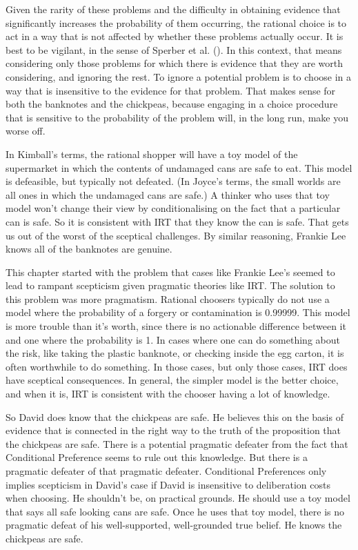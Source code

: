 \documentclass[
  10pt,
  letterpaper,
  twoside]{scrbook}
\begin{document}
Given the rarity of these problems and the difficulty in obtaining
evidence that significantly increases the probability of them occurring,
the rational choice is to act in a way that is not affected by whether
these problems actually occur. It is best to be vigilant, in the sense
of Sperber et al. (). In this
context, that means considering only those problems for which there is
evidence that they are worth considering, and ignoring the rest. To
ignore a potential problem is to choose in a way that is insensitive to
the evidence for that problem. That makes sense for both the banknotes
and the chickpeas, because engaging in a choice procedure that is
sensitive to the probability of the problem will, in the long run, make
you worse off.

In Kimball's terms, the rational shopper will have a toy model of the
supermarket in which the contents of undamaged cans are safe to eat.
This model is defeasible, but typically not defeated. (In Joyce's terms,
the small worlds are all ones in which the undamaged cans are safe.) A
thinker who uses that toy model won't change their view by
conditionalising on the fact that a particular can is safe. So it is
consistent with IRT that they know the can is safe. That gets us out of
the worst of the sceptical challenges. By similar reasoning, Frankie Lee
knows all of the banknotes are genuine.

This chapter started with the problem that cases like Frankie Lee's
seemed to lead to rampant scepticism given pragmatic theories like IRT.
The solution to this problem was more pragmatism. Rational choosers
typically do not use a model where the probability of a forgery or
contamination is 0.99999. This model is more trouble than it's worth,
since there is no actionable difference between it and one where the
probability is 1. In cases where one can do something about the risk,
like taking the plastic banknote, or checking inside the egg carton, it
is often worthwhile to do something. In those cases, but only those
cases, IRT does have sceptical consequences. In general, the simpler
model is the better choice, and when it is, IRT is consistent with the
chooser having a lot of knowledge.

So David does know that the chickpeas are safe. He believes this on the
basis of evidence that is connected in the right way to the truth of the
proposition that the chickpeas are safe. There is a potential pragmatic
defeater from the fact that Conditional Preference seems to rule out
this knowledge. But there is a pragmatic defeater of that pragmatic
defeater. Conditional Preferences only implies scepticism in David's
case if David is insensitive to deliberation costs when choosing. He
shouldn't be, on practical grounds. He should use a toy model that says
all safe looking cans are safe. Once he uses that toy model, there is no
pragmatic defeat of his well-supported, well-grounded true belief. He
knows the chickpeas are safe.
\end{document}
